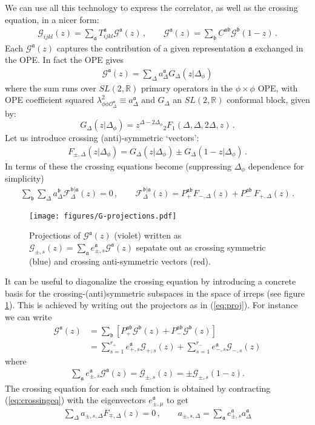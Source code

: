 \documentclass[12pt]{article}
\numberwithin{equation}{section}
\newcommand{\cO}{\mathcal O}
\newcommand{\reef}[1]{(\ref{#1})}
\newcommand{\be}{\begin{equation}}
\newcommand{\ee}{\end{equation}}
\newcommand{\bea}{\begin{eqnarray}}
\newcommand{\eea}{\end{eqnarray}}
\newcommand{\ba}{\begin{equation}\begin{aligned}}
\newcommand{\ea}{\end{aligned}\end{equation}}
\newcommand{\Df}{{\Delta_\phi}}
\def\D{\Delta}
\newcommand{\mf}[1]{\mathfrak #1}
\begin{document}
	
	We can use all this technology to express the correlator, as well as the crossing equation, in a nicer form:
	\bea
	\mathcal G_{ijkl}(z)=\sum_{\mf a} T^{\mf a}_{ijkl} \mathcal G^{\mf a}(z)\,, \qquad \mathcal G^{\mf a}(z)=\sum_{\mf b} C^{\mf a \mf b} \mathcal G^{\mf b}(1-z)\,.
	\eea
	Each $\mathcal G^{\mf a}(z)$ captures the contribution of a given representation $\mf a$ exchanged in the OPE. In fact the OPE gives
	\bea
	\mathcal G^{\mf a}(z)=\sum_{\Delta} a^{\mf a}_{\Delta} G_{\Delta}(z|\Df)
	\eea
	where the sum runs over $SL(2,\mathbb{R})$ primary operators in the $\phi \times \phi$ OPE, with OPE coefficient squared $\lambda_{\phi \phi \cO_\Delta^{\mf a}}^2\equiv a^{\mf a}_{\Delta}$ and $G_\D$ an $SL(2,\mathbb{R})$ conformal block, given by:
	\be
	G_{\D}(z|\Df)=z^{\D-2\D_\phi}{}_2F_1(\D,\D,2\D,z)\,.
	\ee
	Let us introduce crossing (anti)-symmetric `vectors':
	\bea
	F_{\pm,\Delta}(z|\Df)=G_{\D}(z|\Df)\pm G_{\D}(1-z|\Df)\,.
	\eea
	In terms of these the crossing equations become (suppressing $\D_\phi$ dependence for simplicity)
	\bea
	\sum_{\mf b}\sum_{\Delta} a^{\mf b}_{\Delta} \mathcal F^{\mf b|\mf a}_{\Delta}(z)=0\,, \qquad \mathcal F^{\mf b|\mf a}_{\Delta}(z)=P_{+}^{\mf a\mf b} F_{-,\Delta}(z)+P_-^{\mf a \mf b}\, F_{+,\Delta}(z)\,.\label{eq:crossingeq}
	\eea
		\begin{figure}[t]
		\begin{center}
			\texttt{[image: figures/G-projections.pdf]}
			\caption{\label{fig:projections} Projections of $\mathcal{G}^{\mf a}(z)$ (violet) written as $\mathcal{G}_{\pm,s}(z)=\sum_{\mf a}e^{\mf{a}}_{\pm,s}\mathcal{G}^{\mf a}(z)$ sepatate out as crossing symmetric (blue) and crossing anti-symmetric vectors (red). }
		\end{center}
	\end{figure}
  It can be useful to diagonalize the crossing equation by introducing a concrete basis for the crossing-(anti)symmetric subspaces in the space of irreps (see figure \ref{fig:projections}). This is achieved by writing out the projectors as in \reef{eq:proj}. For instance we can write
	\ba
	\mathcal G^{\mf a}(z)&=\sum_{\mf b}\left[ P_{+}^{\mf a \mf b} \mathcal G^{\mf b}(z)+ P_{-}^{\mf a \mf b} \mathcal G^{\mf b}(z)\right]\\
	&=\sum_{s=1}^{r_+}  e_{+,s}^\mf a\mathcal G_{+,s}(z)+\sum_{s=1}^{r_-} e_{-,s}^{\mf a}\mathcal G_{-,s}(z)
	\ea
	where
	\bea
	\sum_{\mf a} e_{\pm,s}^{\mf a}\mathcal G^{\mf a}(z)=\mathcal G_{\pm,s}(z)=\pm \mathcal G_{\pm,s}(1-z).
	\eea
	The crossing equation for each such function is obtained by contracting 
	\reef{eq:crossingeq} with the eigenvectors $e_{\pm,\mu}^{\mf a}$ to get
	\ba
	\sum_{\Delta} a_{\pm,s,\Delta} F_{\mp,\Delta}(z)=0\,, \qquad a_{\pm,s,\Delta}=\sum_{\mf a} e^{\mf a}_{\pm,s} a^{\mf a}_{\Delta} \label{eq:decoupledcrossing}
	\ea
	
\end{document}
